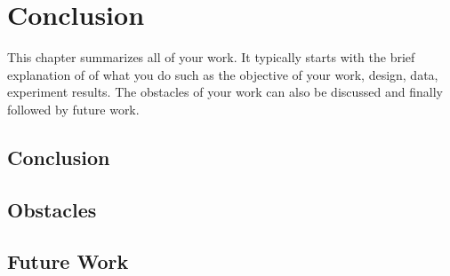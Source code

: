 \chapter{Conclusion}
This chapter summarizes all of your work. It typically starts with the brief explanation of of what you do such as the objective of your work, design, data, experiment results. The obstacles of your work can also be discussed and finally followed by future work. 

\section{Conclusion}
\section{Obstacles}
\section{Future Work}


